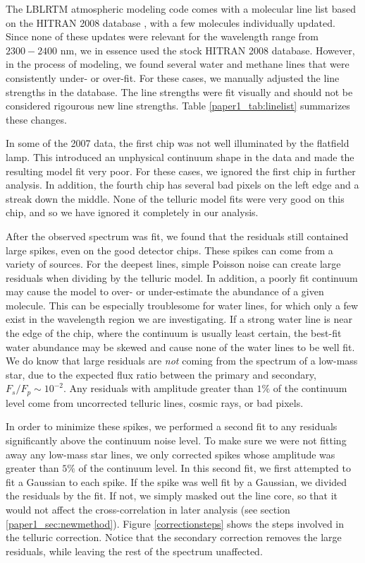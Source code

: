 The LBLRTM atmospheric modeling code comes with a molecular line list
based on the HITRAN 2008 database \citep{Rothman2009}, with a few
molecules individually updated. Since none of these updates were
relevant for the wavelength range from $2300 - 2400$ nm, we in
essence used the stock HITRAN 2008 database. However,
in the process of modeling, we found several water and methane lines
that were consistently under- or over-fit. For these cases, we
manually adjusted the line strengths in the database. The line
strengths were fit visually and should not be considered rigourous new line strengths. Table \ref{paper1_tab:linelist}
summarizes these changes.


In some of the 2007 data, the first chip was not well illuminated
by the flatfield lamp. This introduced an unphysical continuum shape
in the data and made the resulting model fit very poor. For these
cases, we ignored the first chip in further analysis. In addition,
the fourth chip has several bad pixels on the left edge and a streak
down the middle. None of the telluric model fits were very good on
this chip, and so we have ignored it completely in our analysis.

After the observed spectrum was fit, we found that the residuals still
contained large spikes, even on the good detector chips. These spikes
can come from a variety of sources. For the deepest lines, simple
Poisson noise can create large residuals when dividing by the telluric
model. In addition, a poorly fit continuum may cause the model to over- or under-estimate
the abundance of a given molecule. This can be especially troublesome
for water lines, for which only a few exist in the wavelength region we
are investigating. If a strong water line is near the edge of the
chip, where the continuum is usually least certain, the best-fit water
abundance may be skewed and cause none of the water lines to be well fit. We do know
that large residuals are \emph{not} coming from the spectrum of a
low-mass star, due to the expected flux ratio between the primary and
secondary, $F_s/F_p \sim10^{-2}$. Any residuals with amplitude greater than 
$1\%$ of the continuum level come from uncorrected telluric lines,
cosmic rays, or bad pixels. 

In order to minimize these spikes, we performed a second fit to any
residuals significantly above the continuum noise level. To make sure
we were not fitting away any low-mass star lines, we only corrected
spikes whose amplitude was greater than $5\%$ of the continuum level. In this
second fit, we first attempted to fit a Gaussian to each spike. If the
spike was well fit by a Gaussian, we divided the residuals by the fit.
If not, we
simply masked out the line core, so that it would not affect the
cross-correlation in later analysis (see section \ref{paper1_sec:newmethod}). Figure
\ref{correctionsteps} shows the steps involved in the telluric
correction. Notice that the secondary correction removes the
large residuals, while leaving the rest of the spectrum
unaffected. 




